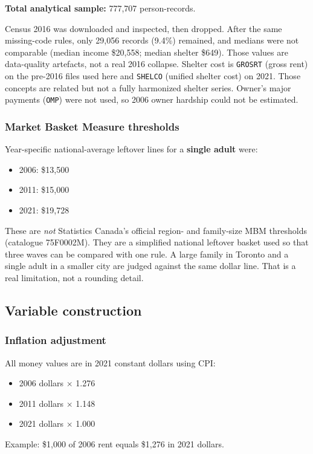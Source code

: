 \documentclass[11pt,letterpaper]{article}
\begin{document}
\textbf{Total analytical sample:} 777,707 person-records.

Census 2016 was downloaded and inspected, then dropped.
After the same missing-code rules, only 29,056 records (9.4\%) remained, and medians were not comparable (median income \$20,558; median shelter \$649).
Those values are data-quality artefacts, not a real 2016 collapse.
Shelter cost is \texttt{GROSRT} (gross rent) on the pre-2016 files used here and \texttt{SHELCO} (unified shelter cost) on 2021.
Those concepts are related but not a fully harmonized shelter series.
Owner's major payments (\texttt{OMP}) were not used, so 2006 owner hardship could not be estimated.

\subsubsection{Market Basket Measure thresholds}

Year-specific national-average leftover lines for a \textbf{single adult} were:
\begin{itemize}[leftmargin=1.4em]
  \item 2006: \$13,500
  \item 2011: \$15,000
  \item 2021: \$19,728
\end{itemize}
These are \emph{not} Statistics Canada's official region- and family-size MBM thresholds (catalogue 75F0002M).
They are a simplified national leftover basket used so that three waves can be compared with one rule.
A large family in Toronto and a single adult in a smaller city are judged against the same dollar line.
That is a real limitation, not a rounding detail.

\subsection{Variable construction}
\label{sec:vars}

\subsubsection{Inflation adjustment}

All money values are in 2021 constant dollars using CPI:
\begin{itemize}[leftmargin=1.4em]
  \item 2006 dollars $\times$ 1.276
  \item 2011 dollars $\times$ 1.148
  \item 2021 dollars $\times$ 1.000
\end{itemize}
Example: \$1,000 of 2006 rent equals \$1,276 in 2021 dollars.
\end{document}
